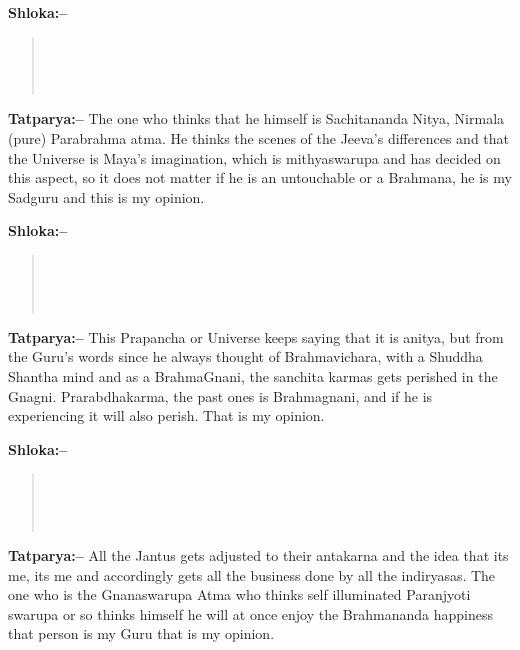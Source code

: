 \textbf{Shloka:–}

\begin{verse}
 \\\\\\ 
\end{verse}

\textbf{Tatparya:–} The one who thinks that he himself is Sachitananda Nitya, Nirmala (pure) Parabrahma atma. He thinks the scenes of the Jeeva's differences and that the Universe is Maya's imagination, which is mithyaswarupa and has decided on this aspect, so it does not matter if he is an untouchable or a Brahmana, he is my Sadguru and this is my opinion.

\textbf{Shloka:–}

\begin{verse}
 \\\\\\ 
\end{verse}

\textbf{Tatparya:–} This Prapancha or Universe keeps saying that it is anitya, but from the Guru's words since he always thought of Brahmavichara, with a Shuddha Shantha mind and as a BrahmaGnani, the sanchita karmas gets perished in the Gnagni. Prarabdhakarma, the past ones is Brahmagnani, and if he is experiencing it will also perish. That is my opinion.

\textbf{Shloka:–}

\begin{verse}
 \\\\\\ 
\end{verse}

\textbf{Tatparya:–} All the Jantus gets adjusted to their antakarna and the idea that its me, its me and accordingly gets all the business done by all the indiryasas. The one who is the Gnanaswarupa Atma who thinks self illuminated Paranjyoti swarupa or so thinks himself he will at once enjoy the Brahmananda happiness that person is my Guru that is my opinion.

